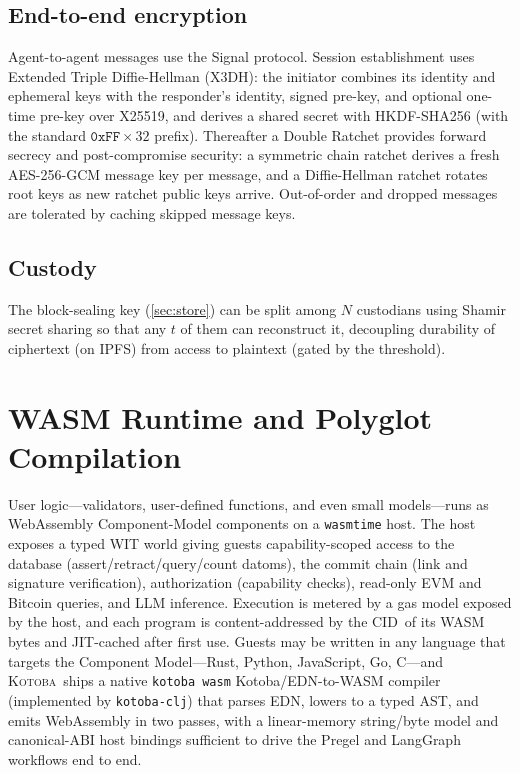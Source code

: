 \documentclass[11pt]{article}
\newcommand{\kotoba}{\textsc{Kotoba}}
\newcommand{\cid}{\textsf{CID}}
\begin{document}
\subsection{End-to-end encryption}
Agent-to-agent messages use the Signal protocol. Session establishment uses
Extended Triple Diffie-Hellman (X3DH): the initiator combines its identity and
ephemeral keys with the responder's identity, signed pre-key, and optional
one-time pre-key over X25519, and derives a shared secret with HKDF-SHA256 (with
the standard $\mathtt{0xFF}{\times}32$ prefix). Thereafter a Double Ratchet
provides forward secrecy and post-compromise security: a symmetric chain ratchet
derives a fresh AES-256-GCM message key per message, and a Diffie-Hellman ratchet
rotates root keys as new ratchet public keys arrive. Out-of-order and dropped
messages are tolerated by caching skipped message keys.

\subsection{Custody}
The block-sealing key (\cref{sec:store}) can be split among $N$ custodians using
Shamir secret sharing so that any $t$ of them can reconstruct it, decoupling
durability of ciphertext (on IPFS) from access to plaintext (gated by the
threshold).

\section{WASM Runtime and Polyglot Compilation}
\label{sec:wasm}

User logic---validators, user-defined functions, and even small models---runs as
WebAssembly Component-Model components on a \texttt{wasmtime} host. The host
exposes a typed WIT world giving guests capability-scoped access to the database
(assert/retract/query/count datoms), the commit chain (link and signature
verification), authorization (capability checks), read-only EVM and Bitcoin
queries, and LLM inference. Execution is metered by a gas model exposed by the
host, and each program is content-addressed by the \cid\ of its WASM
bytes and JIT-cached after first use. Guests may be written in any language that
targets the Component Model---Rust, Python, JavaScript, Go, C---and \kotoba\
ships a native \texttt{kotoba wasm} Kotoba/EDN-to-WASM compiler (implemented by
\texttt{kotoba-clj}) that parses EDN,
lowers to a typed AST, and emits WebAssembly in two passes, with a linear-memory
string/byte model and canonical-ABI host bindings sufficient to drive the Pregel
and LangGraph workflows end to end.
\end{document}

